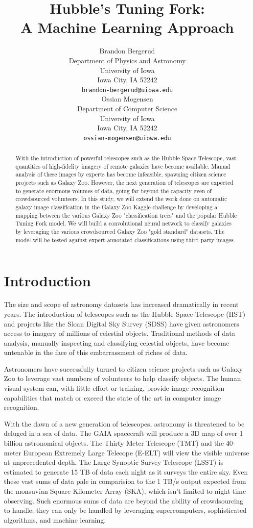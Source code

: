 \documentclass{article}
\title{Hubble's Tuning Fork: \\A Machine Learning Approach}
\author{
  Brandon Bergerud \\
  Department of Physics and Astronomy\\
  University of Iowa\\
  Iowa City, IA  52242 \\
  \texttt{brandon-bergerud@uiowa.edu} \\
  \And
  Ossian Mogensen \\
  Department of Computer Science \\
  University of Iowa \\
  Iowa City, IA  52242 \\
  \texttt{ossian-mogensen@uiowa.edu} \\
}
\begin{document}

\maketitle

\begin{abstract}
With the introduction of powerful telescopes such as the Hubble Space Telescope, vast quantities of high-fidelity imagery of remote galaxies have become available. Manual analysis of these images by experts has become infeasible, spawning citizen science projects such as Galaxy Zoo. However, the next generation of telescopes are expected to generate enormous volumes of data, going far beyond the capacity even of crowdsourced volunteers. In this study, we will extend the work done on automatic galaxy image classification in the Galaxy Zoo Kaggle challenge by developing a mapping between the various Galaxy Zoo "classification trees" and the popular Hubble Tuning Fork model. We will build a convolutional neural network to classify galaxies by leveraging the various crowdsourced Galaxy Zoo "gold standard" datasets. The model will be tested against expert-annotated classifications using third-party images.
\end{abstract}

\section{Introduction}
The size and scope of astronomy datasets has increased dramatically in recent years. The introduction of telescopes such as the Hubble Space Telescope (HST) and projects like the Sloan Digital Sky Survey (SDSS) have given astronomers access to imagery of millions of celestial objects. Traditional methods of data analysis, manually inspecting and classifying celestial objects, have become untenable in the face of this embarrassment of riches of data. 

Astronomers have successfully turned to citizen science projects such as Galaxy Zoo to leverage vast numbers of volunteers to help classify objects. The human visual system can, with little effort or training, provide image recognition capabilities that match or exceed the state of the art in computer image recognition. 

With the dawn of a new generation of telescopes, astronomy is threatened to be deluged in a sea of data. The GAIA spacecraft will produce a 3D map of over 1 billion astronomical objects. The Thirty Meter Telescope (TMT) and the 40-meter European Extremely Large Telecope (E-ELT) will view the visible universe at unprecedented depth. The Large Synoptic Survey Telescope (LSST) is estimated to generate 15 TB of data each night as it surveys the entire sky. Even these vast sums of data pale in comparision to the 1 TB/s output expected from the monsuvian Square Kilometer Array (SKA), which isn't limited to night time observing. Such enormous sums of data are beyond the ability of crowdsourcing to handle: they can only be handled by leveraging supercomputers, sophisticated algorithms, and machine learning.
\end{document}
